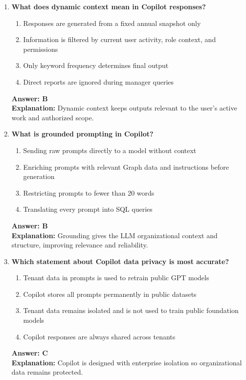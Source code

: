 \documentclass[10pt]{article}
\begin{document}
\begin{enumerate}[leftmargin=*]
\item \textbf{What does dynamic context mean in Copilot responses?}
\begin{enumerate}[label=\Alph*.]
  \item Responses are generated from a fixed annual snapshot only
  \item Information is filtered by current user activity, role context, and permissions
  \item Only keyword frequency determines final output
  \item Direct reports are ignored during manager queries
\end{enumerate}
\textbf{Answer: B}\\
\textbf{Explanation:} Dynamic context keeps outputs relevant to the user’s active work and authorized scope.

\item \textbf{What is grounded prompting in Copilot?}
\begin{enumerate}[label=\Alph*.]
  \item Sending raw prompts directly to a model without context
  \item Enriching prompts with relevant Graph data and instructions before generation
  \item Restricting prompts to fewer than 20 words
  \item Translating every prompt into SQL queries
\end{enumerate}
\textbf{Answer: B}\\
\textbf{Explanation:} Grounding gives the LLM organizational context and structure, improving relevance and reliability.

\item \textbf{Which statement about Copilot data privacy is most accurate?}
\begin{enumerate}[label=\Alph*.]
  \item Tenant data in prompts is used to retrain public GPT models
  \item Copilot stores all prompts permanently in public datasets
  \item Tenant data remains isolated and is not used to train public foundation models
  \item Copilot responses are always shared across tenants
\end{enumerate}
\textbf{Answer: C}\\
\textbf{Explanation:} Copilot is designed with enterprise isolation so organizational data remains protected.



\end{enumerate}
\end{document}
